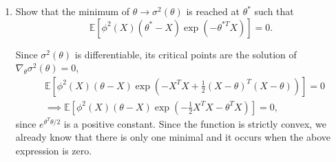 \documentclass[a4paper,12pt]{article}
\newcommand{\ev}{\mathbb{E}}
\theoremstyle{definition}
\begin{document}
\begin{enumerate}
    \item Show that the minimum of $\theta \to \sigma^2(\theta)$ is 
    reached at $\theta^{*}$ such that
    $$
    \ev[\phi^2(X)(\theta^* - X)\exp(-\theta^{*T}X)] = 0.
    $$

    Since $\sigma^2(\theta)$ is differentiable, its critical points are 
    the solution of $\nabla_\theta \sigma^2(\theta) = 0$, 
    \begin{equation*}
        \begin{split}
            &\ev\left[\phi^2(X)(\theta-X)\exp\left(-X^TX +
        \frac{1}{2}(X-\theta)^T(X-\theta)\right)\right] = 0 \\
        &\implies \ev\left[\phi^2(X)(\theta-X)\exp\left(-\frac{1}{2}X^TX
        -\theta^TX\right)\right] = 0, 
        \end{split}
    \end{equation*}  
    since $e^{\theta^T\theta/2}$ is a positive constant. Since the function 
    is strictly convex, we already know that there is only one minimal 
    and it occurs when the above expression is zero. 
\end{enumerate}


% 
% 
\end{document}
